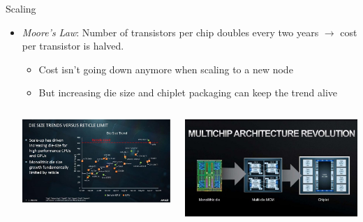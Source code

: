 \documentclass[12pt]{beamer}
\begin{document}
\begin{frame}{Scaling}
  \begin{itemize}
    \item \textit{Moore's Law}: Number of transistors per chip doubles every two years $\rightarrow$ cost per transistor is halved.
      \begin{itemize}
        \item Cost isn't going down anymore when scaling to a new node
        \item But increasing die size and chiplet packaging can keep the trend alive
      \end{itemize}
      \vspace{0.5cm}
    \begin{columns}
    \begin{column}{0.5\textwidth}
        \begin{center}
         \includegraphics[width=\textwidth]{amd_die_size.jpg}
         \end{center}
    \end{column}
    \begin{column}{0.5\textwidth}  %
        \begin{center}
         \includegraphics[width=\textwidth]{amd_mcm.jpg}
         \end{center}
    \end{column}
    \end{columns}
  \end{itemize}
\end{frame}
\end{document}
